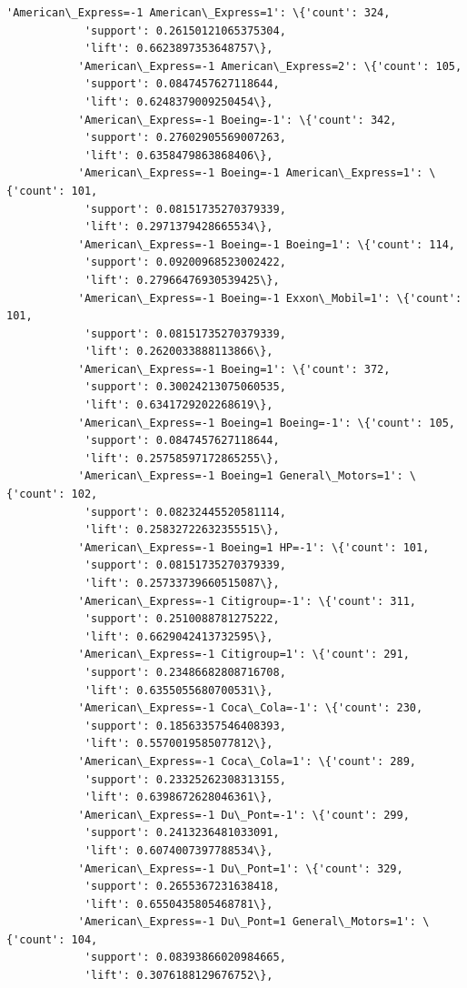 \documentclass[11pt]{article}
\begin{document}
\begin{Verbatim}[commandchars=\\\{\}]
           'American\_Express=-1 American\_Express=1': \{'count': 324,
            'support': 0.26150121065375304,
            'lift': 0.6623897353648757\},
           'American\_Express=-1 American\_Express=2': \{'count': 105,
            'support': 0.0847457627118644,
            'lift': 0.6248379009250454\},
           'American\_Express=-1 Boeing=-1': \{'count': 342,
            'support': 0.27602905569007263,
            'lift': 0.6358479863868406\},
           'American\_Express=-1 Boeing=-1 American\_Express=1': \{'count': 101,
            'support': 0.08151735270379339,
            'lift': 0.2971379428665534\},
           'American\_Express=-1 Boeing=-1 Boeing=1': \{'count': 114,
            'support': 0.09200968523002422,
            'lift': 0.27966476930539425\},
           'American\_Express=-1 Boeing=-1 Exxon\_Mobil=1': \{'count': 101,
            'support': 0.08151735270379339,
            'lift': 0.2620033888113866\},
           'American\_Express=-1 Boeing=1': \{'count': 372,
            'support': 0.30024213075060535,
            'lift': 0.6341729202268619\},
           'American\_Express=-1 Boeing=1 Boeing=-1': \{'count': 105,
            'support': 0.0847457627118644,
            'lift': 0.25758597172865255\},
           'American\_Express=-1 Boeing=1 General\_Motors=1': \{'count': 102,
            'support': 0.08232445520581114,
            'lift': 0.25832722632355515\},
           'American\_Express=-1 Boeing=1 HP=-1': \{'count': 101,
            'support': 0.08151735270379339,
            'lift': 0.25733739660515087\},
           'American\_Express=-1 Citigroup=-1': \{'count': 311,
            'support': 0.2510088781275222,
            'lift': 0.6629042413732595\},
           'American\_Express=-1 Citigroup=1': \{'count': 291,
            'support': 0.23486682808716708,
            'lift': 0.6355055680700531\},
           'American\_Express=-1 Coca\_Cola=-1': \{'count': 230,
            'support': 0.18563357546408393,
            'lift': 0.5570019585077812\},
           'American\_Express=-1 Coca\_Cola=1': \{'count': 289,
            'support': 0.23325262308313155,
            'lift': 0.6398672628046361\},
           'American\_Express=-1 Du\_Pont=-1': \{'count': 299,
            'support': 0.2413236481033091,
            'lift': 0.6074007397788534\},
           'American\_Express=-1 Du\_Pont=1': \{'count': 329,
            'support': 0.2655367231638418,
            'lift': 0.6550435805468781\},
           'American\_Express=-1 Du\_Pont=1 General\_Motors=1': \{'count': 104,
            'support': 0.08393866020984665,
            'lift': 0.3076188129676752\},

\end{Verbatim}
\end{document}
